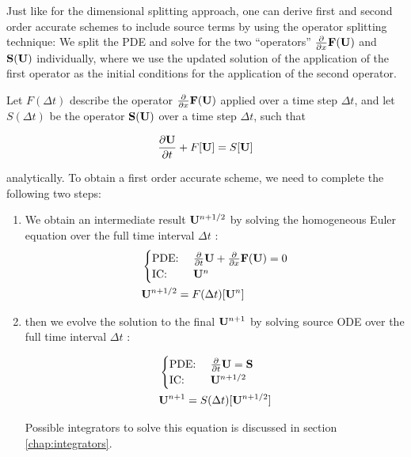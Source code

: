 Just like for the dimensional splitting approach, one can derive first and second order accurate schemes to include source terms by using the operator splitting technique:
We split the PDE and solve for the two ``operators'' $\frac{\partial}{\partial x} \mathbf{F}(\mathbf{U})$ and $\mathbf{S}(\mathbf{U})$ individually, where we use the updated solution of the application of the first operator as the initial conditions for the application of the second operator.

Let $F(\Delta t)$ describe the operator $\frac{\partial}{\partial x} \mathbf{F}(\mathbf{U})$ applied over a time step $\Delta t$, and let $S(\Delta t)$ be the operator $\mathbf{S}(\mathbf{U})$ over a time step $\Delta t$, such that

\begin{align}
	\frac{\partial \mathbf{U}}{\partial t} + F [\mathbf{U}] = S [\mathbf{U}]
\end{align}

analytically.
To obtain a first order accurate scheme, we need to complete the following two steps:

\begin{enumerate}


\item 	We obtain an intermediate result $\mathbf{U}^{n+1/2}$ by solving the homogeneous Euler equation over the full time interval $\Delta t$ :
	\begin{align}
		&\begin{cases}
			\text{PDE: } & \frac{\partial}{\partial t}{\mathbf{U}} + \frac{\partial}{\partial x}{\mathbf{F}(\mathbf{U})} = 0\\
			\text{IC: } &  \mathbf{U}^n\\
		\end{cases}\\
		&\mathbf{U}^{n+1/2} = F(\Delta t)[\mathbf{U}^n]
	\end{align}

\item  then we evolve the solution to the final $\mathbf{U}^{n+1}$ by solving source ODE over the full time interval $\Delta t$ :

	\begin{align}
		&\begin{cases}
			\text{PDE: } & \frac{\partial}{\partial t}{\mathbf{U}}  = \mathbf{S}\\
			\text{IC: } & \mathbf{U}^{n+1/2} \\
		\end{cases}\\
		& \mathbf{U}^{n+1} = S(\Delta t)[\mathbf{U}^{n+1/2}]
	\end{align}
	
	Possible integrators to solve this equation is discussed in section \ref{chap:integrators}.

\end{enumerate}



